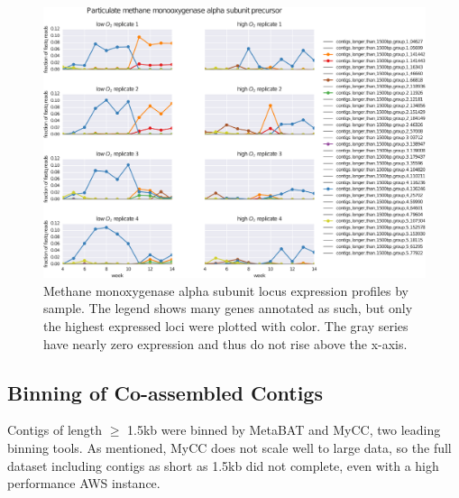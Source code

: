 \begin{figure}[H]
\centering
    \includegraphics[width=1.0\textwidth]{./tex/chapter2/figures/170328_loci_read_fracs_Particulate_methane_monooxygenase_alpha_subunit_precursor--portrait--cleaned.pdf}
    \begin{singlespace}
    \caption[Methane monoxygenase alpha subunit locus expression profiles by sample]{
        Methane monoxygenase alpha subunit locus expression profiles by sample.
        The legend shows many genes annotated as such, but only the highest expressed loci were plotted with color.
        The gray series have nearly zero expression and thus do not rise above the x-axis.
        }
    \label{fig:mmo_alpha}
    \end{singlespace}
\end{figure}

\subsection{Binning of Co-assembled Contigs}    %

Contigs of length $\geq$ 1.5kb were binned by MetaBAT and MyCC, two leading binning tools.
As mentioned, MyCC does not scale well to large data, so the full dataset including contigs as short as 1.5kb did not complete, even with a high performance AWS instance.

